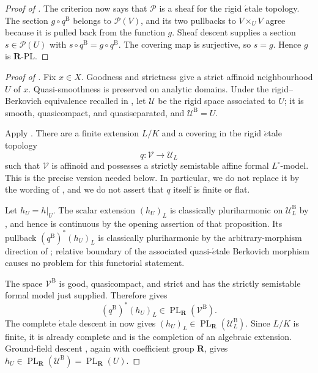 \begin{proof}[Proof of ]
The criterion \cite[Proposition~3.2.2]{dJvdP96} now says that
\(\mathscr P\) is a sheaf for the rigid \(\acute{e}\)tale topology.  The
section \(g\circ q^{\mathrm B}\) belongs to \(\mathscr P(V)\), and its two
pullbacks to \(V\times_UV\) agree because it is pulled back from the
function \(g\).  Sheaf descent supplies a section \(s\in\mathscr P(U)\)
with \(s\circ q^{\mathrm B}=g\circ q^{\mathrm B}\).  The covering map is
surjective, so \(s=g\).  Hence \(g\) is \(\mathbf R\)-PL.
\end{proof}

\begin{proof}[Proof of ]
Fix \(x\in X\).  Goodness and strictness give a strict affinoid
neighbourhood \(U\) of \(x\).  Quasi-smoothness is preserved on analytic
domains.  Under the rigid--Berkovich equivalence recalled in
\cite[\S3.4]{Temkin17}, let \(\mathcal U\) be the rigid space associated to
\(U\); it is smooth, quasicompact, and quasiseparated, and
\(\mathcal U^{\mathrm B}=U\).

Apply \cite[Corollary~3.3.2]{Temkin17}.  There are a finite extension
\(L/K\) and a covering in the rigid \(\acute{e}\)tale topology
\[
                 q:\mathcal V\longrightarrow\mathcal U_L
\]
such that \(\mathcal V\) is affinoid and possesses a strictly semistable
affine formal \(L^\circ\)-model.  This is the precise version needed below.
In particular, we do not replace it by the wording of
\cite[Theorem~3.4.1]{Temkin17}, and we do not assert that \(q\) itself is
finite or flat.

Let \(h_U=h|_U\).  The scalar extension \((h_U)_L\) is classically
pluriharmonic on \(\mathcal U_L^{\mathrm B}\) by
\cite[Proposition~7.2(6)]{GR25Classical}, and hence is continuous by the
opening assertion of that proposition.  Its pullback
\((q^{\mathrm B})^*(h_U)_L\) is classically pluriharmonic by the
arbitrary-morphism
direction of \cite[Proposition~7.2(7)]{GR25Classical}; relative boundary of
the associated quasi-\(\acute{e}\)tale Berkovich morphism causes no problem
for this functorial statement.

The space \(\mathcal V^{\mathrm B}\) is good, quasicompact, and strict and
has the strictly semistable formal model just supplied.  Therefore
\cite[Proposition~7.8]{GR25Classical} gives
\[
                   (q^{\mathrm B})^*(h_U)_L\in
                   \operatorname{PL}_{\mathbf R}(\mathcal V^{\mathrm B}).
\]
The complete \(\acute{e}\)tale descent in
 now gives
\((h_U)_L\in
\operatorname{PL}_{\mathbf R}(\mathcal U_L^{\mathrm B})\).  Since \(L/K\)
is finite, it is already complete and is the completion of an algebraic
extension.  Ground-field descent
\cite[Corollary~5.12]{GJR26}, again with coefficient group \(\mathbf R\),
gives
\(h_U\in\operatorname{PL}_{\mathbf R}(\mathcal U^{\mathrm B})
=\operatorname{PL}_{\mathbf R}(U)\).


\end{proof}
